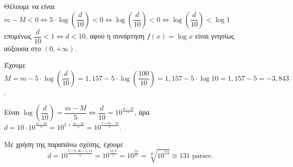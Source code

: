 \begin{alist}
\item Θέλουμε να είναι $m - M < 0 \Leftrightarrow 5 \cdot \log\left(\dfrac{d}{10}\right) < 0 \Leftrightarrow \log\left(\dfrac{d}{10}\right) < 0 \Leftrightarrow \log\left(\dfrac{d}{10}\right) < \log 1$ \\
επομένως $\dfrac{d}{10} < 1 \Leftrightarrow d < 10$, αφού η συνάρτηση $f(x) = \log x$ είναι γνησίως αύξουσα στο $(0, +\infty)$.
\item Έχουμε $M = m - 5 \cdot \log\left(\dfrac{d}{10}\right) = 1{,}157 - 5 \cdot \log\left(\dfrac{100}{10}\right) = 1{,}157 - 5 \cdot \log 10 = 1{,}157 - 5 = -3{,}843$.
\item Είναι $\log\left(\dfrac{d}{10}\right) = \dfrac{m-M}{5} \Leftrightarrow \dfrac{d}{10} = 10^{\frac{m-M}{5}}$, άρα $d = 10 \cdot 10^{\frac{m-M}{5}} = 10^{1 + \frac{m-M}{5}} = 10^{\frac{5+m-M}{5}}$.
\item Με χρήση της παραπάνω σχέσης, έχουμε
\[d = 10^{\frac{5+0{,}46+5{,}14}{5}} = 10^{\frac{10{,}6}{5}} = 10^{\frac{53}{25}} = \sqrt[25]{10^{53}} \cong 131 \text{ parsec}.\]
\end{alist}

